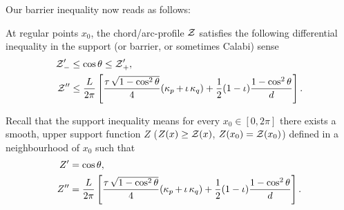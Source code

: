 \documentclass[11pt]{amsart}
\begin{document}
Our barrier inequality now reads as follows:

\begin{theorem}
\label{thm:barrier}
At regular points \(x_0\), the chord/arc-profile $\operatorname{\mathcal{Z}}$ satisfies the following differential inequality in the support (or barrier, or sometimes Calabi) sense
\begin{align*}
\operatorname{\mathcal{Z}}'_- &\leq \cos\theta \leq \operatorname{\mathcal{Z}}'_+, \\
\operatorname{\mathcal{Z}}'' &\leq \frac{L}{2\pi}\left[\frac{\operatorname{\tau} \sqrt{1-\cos^2\theta}}{4} (\operatorname{\kappa}_p + \operatorname{\iota}\operatorname{\kappa}_q) + \frac{1}{2}(1-\operatorname{\iota}) \frac{1-\cos^2\theta}{d}\right].
\end{align*}
\end{theorem}

Recall that the support inequality means for every \(x_0 \in [0,2\pi]\) there exists a smooth, upper support function \(Z\) (\(Z(x) \geq \operatorname{\mathcal{Z}} (x)\), \(Z(x_0) = \operatorname{\mathcal{Z}}(x_0)\)) defined in a neighbourhood of \(x_0\) such that
\begin{align*}
Z' &= \cos \theta, \\
Z'' &= \frac{L}{2\pi}\left[\frac{\operatorname{\tau}\sqrt{1-\cos^2\theta}}{4} (\operatorname{\kappa}_p + \operatorname{\iota}\operatorname{\kappa}_q) + \frac{1}{2} (1-\operatorname{\iota}) \frac{1-\cos^2\theta}{d}\right].
\end{align*}
\end{document}

